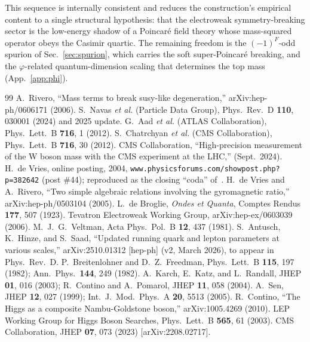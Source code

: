 \documentclass[twocolumn,aps,prd,floatfix,nofootinbib,superscriptaddress,10pt]{article}
\begin{document}
This sequence is internally consistent and reduces the construction's empirical content to a single structural hypothesis: that the electroweak symmetry-breaking sector is the low-energy shadow of a Poincar\'e field theory whose mass-squared operator obeys the Casimir quartic. The remaining freedom is the $(-1)^F$-odd spurion of Sec.~\ref{sec:spurion}, which carries the soft super-Poincar\'e breaking, and the $\varphi$-related quantum-dimension scaling that determines the top mass (App.~\ref{app:phi}).

\begin{thebibliography}{99}
 A.~Rivero, ``Mass terms to break susy-like degeneration,'' arXiv:hep-ph/0606171 (2006).
 S.~Navas \emph{et al.} (Particle Data Group), Phys.\ Rev.\ D \textbf{110}, 030001 (2024) and 2025 update.
 G.~Aad \emph{et al.} (ATLAS Collaboration), Phys.\ Lett.\ B \textbf{716}, 1 (2012).
 S.~Chatrchyan \emph{et al.} (CMS Collaboration), Phys.\ Lett.\ B \textbf{716}, 30 (2012).
 CMS Collaboration, ``High-precision measurement of the W boson mass with the CMS experiment at the LHC,'' (Sept.\ 2024).
 H.~de Vries, online posting, 2004, \texttt{www.physicsforums.com/showpost.php?p=382642} (post \#44); reproduced as the closing ``coda'' of~\cite{Rivero2006}.
 H.~de Vries and A.~Rivero, ``Two simple algebraic relations involving the gyromagnetic ratio,'' arXiv:hep-ph/0503104 (2005).
 L.~de Broglie, \emph{Ondes et Quanta}, Comptes Rendus \textbf{177}, 507 (1923).
 Tevatron Electroweak Working Group, arXiv:hep-ex/0603039 (2006).
 M.~J.~G.~Veltman, Acta Phys.\ Pol.\ B \textbf{12}, 437 (1981).
 S.~Antusch, K.~Hinze, and S.~Saad, ``Updated running quark and lepton parameters at various scales,'' arXiv:2510.01312 [hep-ph] (v2, March 2026), to appear in Phys.\ Rev.\ D.
 P.~Breitenlohner and D.~Z.~Freedman, Phys.\ Lett.\ B \textbf{115}, 197 (1982); Ann.\ Phys.\ \textbf{144}, 249 (1982).
 A.~Karch, E.~Katz, and L.~Randall, JHEP \textbf{01}, 016 (2003); R.~Contino and A.~Pomarol, JHEP \textbf{11}, 058 (2004).
 A.~Sen, JHEP \textbf{12}, 027 (1999); Int.\ J.\ Mod.\ Phys.\ A \textbf{20}, 5513 (2005).
 R.~Contino, ``The Higgs as a composite Nambu-Goldstone boson,'' arXiv:1005.4269 (2010).
 LEP Working Group for Higgs Boson Searches, Phys.\ Lett.\ B \textbf{565}, 61 (2003).
 CMS Collaboration, JHEP \textbf{07}, 073 (2023) [arXiv:2208.02717].

\end{thebibliography}
\end{document}
